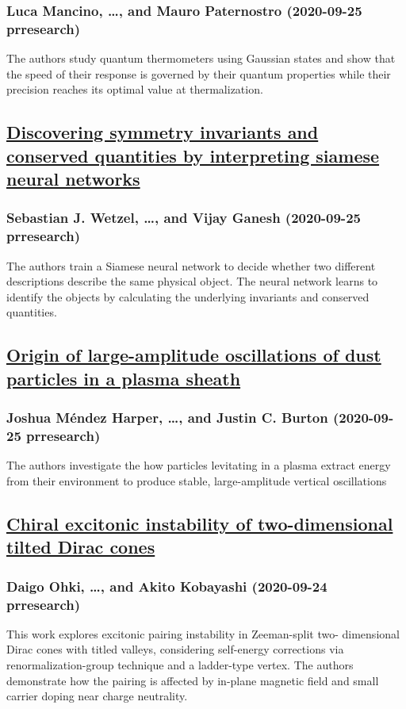 \subsubsection*{Luca Mancino, \dots, and Mauro Paternostro (2020-09-25 prresearch)}
The authors study quantum thermometers using Gaussian states and show that the speed of their response is governed by their quantum properties while their precision reaches its optimal value at thermalization.
\subsection*{\href{http://link.aps.org/doi/10.1103/PhysRevResearch.2.033499}{Discovering symmetry invariants and conserved quantities by interpreting siamese neural networks}}
\subsubsection*{Sebastian J. Wetzel, \dots, and Vijay Ganesh (2020-09-25 prresearch)}
The authors train a Siamese neural network to decide whether two different descriptions describe the same physical object. The neural network learns to identify the objects by calculating the underlying invariants and conserved quantities.
\subsection*{\href{http://link.aps.org/doi/10.1103/PhysRevResearch.2.033500}{Origin of large-amplitude oscillations of dust particles in a plasma sheath}}
\subsubsection*{Joshua Méndez Harper, \dots, and Justin C. Burton (2020-09-25 prresearch)}
The authors investigate the how particles levitating in a plasma extract energy from their environment to produce stable, large-amplitude vertical oscillations
\subsection*{\href{http://link.aps.org/doi/10.1103/PhysRevResearch.2.033479}{Chiral excitonic instability of two-dimensional tilted Dirac cones}}
\subsubsection*{Daigo Ohki, \dots, and Akito Kobayashi (2020-09-24 prresearch)}
This work explores excitonic pairing instability in Zeeman-split two- dimensional Dirac cones with titled valleys, considering self-energy corrections via renormalization-group technique and a ladder-type vertex. The authors demonstrate how the pairing is affected by in-plane magnetic field and small carrier doping near charge neutrality.
